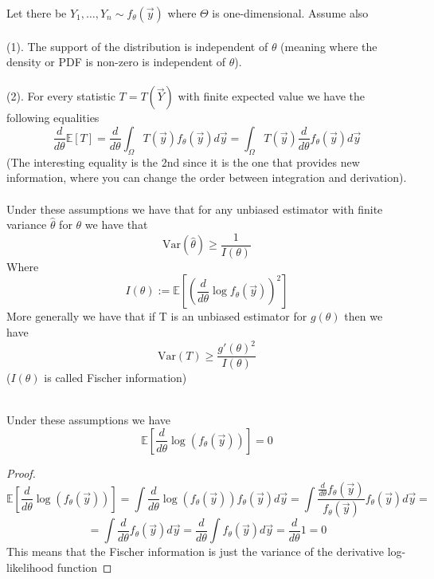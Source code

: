 \documentclass[../main.tex]{subfiles}
\begin{document}
\begin{theorem}
Let there be $Y_1,\dots,Y_n\sim f_{\theta}(\overrightarrow{y})$ where $\Theta$ is one-dimensional. Assume also \\\\
(1). The support of the distribution is independent of $\theta$ (meaning where the density or PDF is non-zero is independent of $\theta$). \\\\
(2). For every statistic $T=T(\overrightarrow{Y})$ with finite expected value we have the following equalities
\[\frac{d}{d\theta}\mathbb{E}[T] = \frac{d}{d\theta} \int_\Omega T(\overrightarrow{y})f_{\theta}(\overrightarrow{y}) d\overrightarrow{y} = \int_{\Omega} T(\overrightarrow{y}) \frac{d}{d\theta} f_{\theta}(\overrightarrow{y})d\overrightarrow{y}\]
(The interesting equality is the 2nd since it is the one that provides new information, where you can change the order between integration and derivation). \\\\
Under these assumptions we have that for any unbiased estimator with finite variance $\hat{\theta}$ for $\theta$ we have that
\[\text{Var}(\hat{\theta})\geq\frac{1}{I(\theta)}\]
Where \[I(\theta):= \mathbb{E}\left[\left(\frac{d}{d\theta}\log f_{\theta}(\overrightarrow{y})\right)^2\right]\]
More generally we have that if T is an unbiased estimator for $g(\theta)$ then we have 
\[\text{Var}(T)\geq \frac{g'(\theta)^2}{I(\theta)}\]
($I(\theta)$ is called Fischer information) \\\\
\end{theorem}
\begin{claim}
Under these assumptions we have \[\mathbb{E}\left[\frac{d}{d\theta}\log(f_{\theta}(\overrightarrow{y}))\right] = 0\]
\end{claim}
\begin{proof}
\[\mathbb{E}\left[\frac{d}{d\theta}\log(f_{\theta}(\overrightarrow{y}))\right] = \int \frac{d}{d\theta}\log(f_{\theta}(\overrightarrow{y})) f_{\theta}(\overrightarrow{y}) d\overrightarrow{y} = \int\frac{\frac{d}{d\theta}
f_{\theta}(\overrightarrow{y})}{f_{\theta}(\overrightarrow{y})} f_{\theta}(\overrightarrow{y}) d\overrightarrow{y} = \]\[=\int\frac{d}{d\theta}f_{\theta}(\overrightarrow{y})d\overrightarrow{y } = \frac{d}{d\theta} \int f_{\theta}(\overrightarrow{y})d\overrightarrow{y} = \frac{d}{d\theta} 1 =0\]
This means that the Fischer information is just the variance of the derivative log-likelihood function
\end{proof}
\end{document}
